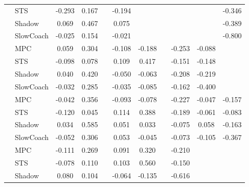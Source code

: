 \begin{tabular}{|l|l|*{9}{c|}}
                                                           & STS &   -0.293 &     0.167 &        & -0.194 &     &     &      &      &   -0.346 \\
                                                           & Shadow &    0.069 &     0.467 &        &  0.075 &     &     &      &      &   -0.389 \\
                                                           & SlowCoach &   -0.025 &     0.154 &        & -0.021 &     &     &      &      &   -0.800 \\
\midrule
[True, True, False, True, True, False, True, True, False] & MPC &    0.059 &     0.304 &        & -0.108 & -0.188 &     &  -0.253 &  -0.088 &       \\
                                                           & STS &   -0.098 &     0.078 &        &  0.109 &  0.417 &     &  -0.151 &  -0.148 &       \\
                                                           & Shadow &    0.040 &     0.420 &        & -0.050 & -0.063 &     &  -0.208 &  -0.219 &       \\
                                                           & SlowCoach &   -0.032 &     0.285 &        & -0.035 & -0.085 &     &  -0.162 &  -0.400 &       \\
\midrule
[True, True, False, True, True, False, True, True, True] & MPC &   -0.042 &     0.356 &        & -0.093 & -0.078 &     &  -0.227 &  -0.047 &   -0.157 \\
                                                           & STS &   -0.120 &     0.045 &        &  0.114 &  0.388 &     &  -0.189 &  -0.061 &   -0.083 \\
                                                           & Shadow &    0.034 &     0.585 &        &  0.051 &  0.033 &     &  -0.075 &   0.058 &   -0.163 \\
                                                           & SlowCoach &   -0.052 &     0.306 &        &  0.053 & -0.045 &     &  -0.073 &  -0.105 &   -0.367 \\
\midrule
[True, True, False, True, True, False, True, False, False] & MPC &   -0.111 &     0.269 &        &  0.091 &  0.320 &     &  -0.210 &      &       \\
                                                           & STS &   -0.078 &     0.110 &        &  0.103 &  0.560 &     &  -0.150 &      &       \\
                                                           & Shadow &    0.080 &     0.104 &        & -0.064 & -0.135 &     &  -0.616 &      &       \\

\end{tabular}
